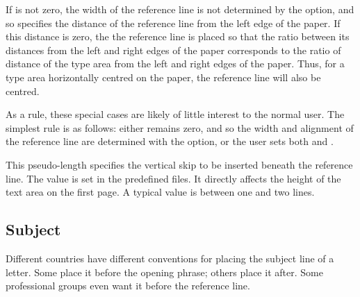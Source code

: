 If  is not zero, the width of the reference line is not
determined by the   option, and so
 specifies the distance of the reference line from the left
edge of the paper. If this distance is zero, the the
reference line is placed so that the ratio between its distances from the left
and right edges of the paper corresponds to the ratio of distance of the type
area from the left and right edges of the paper. Thus, for a type area
horizontally centred on the paper, the reference line will also be centred.

As a rule, these special cases are likely of little interest to the normal
user. The simplest rule is as follows: either
 remains zero, and so the width and alignment of the
reference line are determined with the 
option, or the user sets both  and .%
\EndIndexGroup


\begin{Declaration}
\end{Declaration}
This pseudo-length specifies the vertical skip to be inserted beneath the
reference line. The value is set in the predefined 
files. It directly
affects the height of the text area on the first page. A typical value is
between one and two lines.%
\EndIndexGroup
%
\EndIndexGroup


\subsection{Subject}
%
\BeginIndexGroup
{}

Different countries have different conventions for placing the subject line of
a letter. Some place it before the opening phrase; others place it after. Some
professional groups even want it before the reference line.

